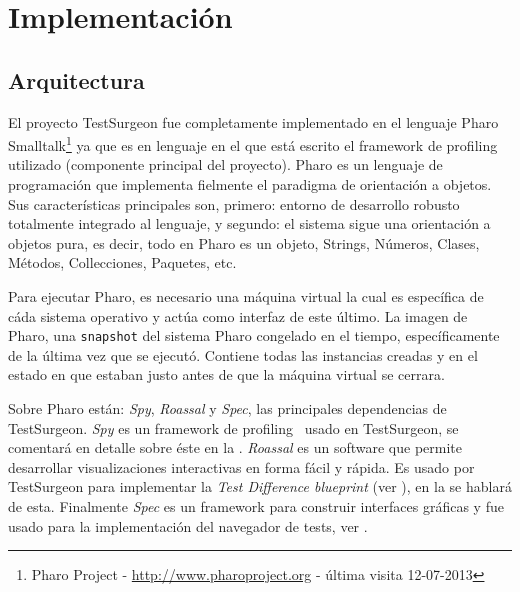 \chapter{Implementación}


\section{Arquitectura}

\par El proyecto TestSurgeon fue completamente implementado en el lenguaje Pharo Smalltalk\footnote{Pharo Project - \url{http://www.pharoproject.org} - última visita 12-07-2013 } ya que es en lenguaje en el que está escrito el framework de profiling utilizado (componente principal del proyecto). Pharo es un lenguaje de programación que implementa fielmente el paradigma de orientación a objetos. Sus características principales son, primero: entorno de desarrollo robusto totalmente integrado al lenguaje, y segundo: el sistema sigue una orientación a objetos pura, es decir, todo en Pharo es un objeto, Strings, Números, Clases, Métodos, Collecciones, Paquetes, etc. 

\par Para ejecutar Pharo, es necesario una máquina virtual la cual es específica de cáda sistema operativo y actúa como interfaz de este último. La imagen de Pharo, una {\tt snapshot} del sistema Pharo congelado en el tiempo, específicamente de la última vez que se ejecutó. Contiene todas las instancias creadas y en el estado en que estaban justo antes de que la máquina virtual se cerrara.

\par Sobre Pharo están: \emph{Spy}, \emph{Roassal} y \emph{Spec}, las principales dependencias de TestSurgeon. \emph{Spy} es un framework de profiling~\cite{Berg11h} usado en TestSurgeon, se comentará en detalle sobre éste en la . \emph{Roassal} es un software que permite desarrollar visualizaciones interactivas en forma fácil y rápida. Es usado por TestSurgeon para implementar la \emph{Test Difference blueprint} (ver ), en la  se hablará de esta. Finalmente \emph{Spec} es un framework para construir interfaces gráficas y fue usado para la implementación del navegador de tests, ver .

